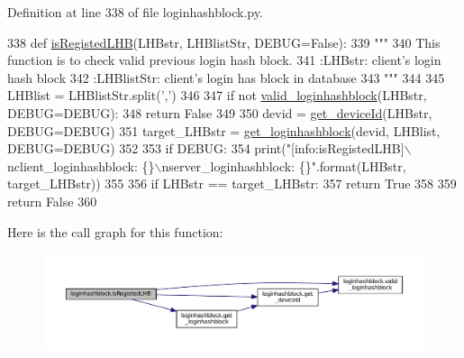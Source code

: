 Definition at line 338 of file loginhashblock.\+py.


\begin{DoxyCode}
338 \textcolor{keyword}{def }\hyperlink{namespaceloginhashblock_a746d5c48cd93a76b78c90c34419ebdaa}{isRegistedLHB}(LHBstr, LHBlistStr, DEBUG=False):
339     \textcolor{stringliteral}{"""}
340 \textcolor{stringliteral}{    This function is to check valid previous login hash block.}
341 \textcolor{stringliteral}{    :LHBstr: client's login hash block}
342 \textcolor{stringliteral}{    :LHBlistStr: client's login has block in database}
343 \textcolor{stringliteral}{    """}
344 
345     LHBlist = LHBlistStr.split(\textcolor{stringliteral}{','})
346 
347     \textcolor{keywordflow}{if} \textcolor{keywordflow}{not} \hyperlink{namespaceloginhashblock_adb424539d851426da7b65d53c5a6d577}{valid\_loginhashblock}(LHBstr, DEBUG=DEBUG):
348         \textcolor{keywordflow}{return} \textcolor{keyword}{False}
349 
350     devid = \hyperlink{namespaceloginhashblock_a17417f2f6bca76ab51170082a562e5f6}{get\_deviceId}(LHBstr, DEBUG=DEBUG)
351     target\_LHBstr = \hyperlink{namespaceloginhashblock_a6187961cb9009c7836e7e6e639085f93}{get\_loginhashblock}(devid, LHBlist, DEBUG=DEBUG)
352 
353     \textcolor{keywordflow}{if} DEBUG:
354         print(\textcolor{stringliteral}{"[info:isRegistedLHB]\(\backslash\)nclient\_loginhashblock: \{\}\(\backslash\)nserver\_loginhashblock: \{\}"}.format(LHBstr, 
      target\_LHBstr))
355 
356     \textcolor{keywordflow}{if} LHBstr == target\_LHBstr:
357         \textcolor{keywordflow}{return} \textcolor{keyword}{True}
358 
359     \textcolor{keywordflow}{return} \textcolor{keyword}{False}
360 
\end{DoxyCode}


Here is the call graph for this function\+:\nopagebreak
\begin{figure}[H]
\begin{center}
\leavevmode
\includegraphics[width=350pt]{namespaceloginhashblock_a746d5c48cd93a76b78c90c34419ebdaa_cgraph}
\end{center}
\end{figure}


